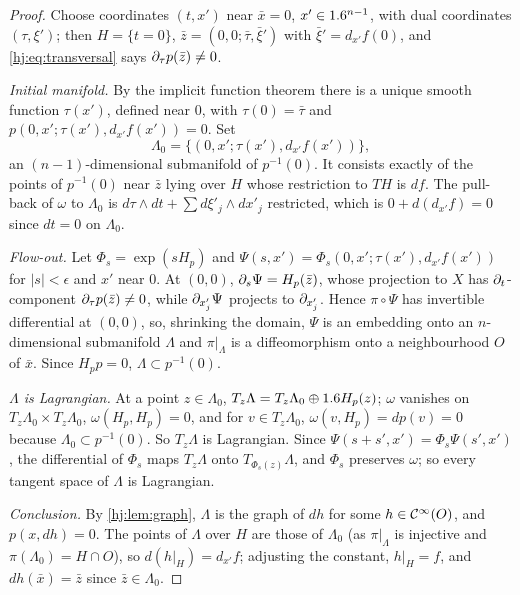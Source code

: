 \begin{proof}
  Choose coordinates $(t,x')$ near $\bar x=0$, $x'\in1.6^{n-1}$, with dual
  coordinates $(\tau,\xi')$; then $H=\{t=0\}$, $\bar z=(0,0;\bar\tau,\bar\xi')$
  with $\bar\xi'=d_{x'}f(0)$, and \eqref{hj:eq:transversal} says
  $\partial_\tau p(\bar z)\neq0$.

  \emph{Initial manifold.}  By the implicit function theorem there is a unique
  smooth function $\tau(x')$, defined near $0$, with $\tau(0)=\bar\tau$ and
  $p(0,x';\tau(x'),d_{x'}f(x'))=0$.  Set
  \begin{equation}\label{hj:eq:Lambda0}
    \Lambda_0=\{(0,x';\tau(x'),d_{x'}f(x'))\},
  \end{equation}
  an $(n-1)$-dimensional submanifold of $p^{-1}(0)$.  It consists exactly of the
  points of $p^{-1}(0)$ near $\bar z$ lying over $H$ whose restriction to $TH$ is
  $df$.  The pull-back of $\omega$ to $\Lambda_0$ is $d\tau\wedge dt+\sum
  d\xi'_j\wedge dx'_j$ restricted, which is $0+d(d_{x'}f)=0$ since $dt=0$ on
  $\Lambda_0$.

  \emph{Flow-out.}  Let $\Phi_s=\exp(sH_p)$ and $\Psi(s,x')=\Phi_s(0,x';\tau(x'),
  d_{x'}f(x'))$ for $|s|<\epsilon$ and $x'$ near $0$.  At $(0,0)$, $\partial_s\Psi=
  H_p(\bar z)$, whose projection to $X$ has $\partial_t$-component $\partial_\tau
  p(\bar z)\neq0$, while $\partial_{x'_j}\Psi$ projects to $\partial_{x'_j}$.  Hence
  $\pi\circ\Psi$ has invertible differential at $(0,0)$, so, shrinking the
  domain, $\Psi$ is an embedding onto an $n$-dimensional submanifold $\Lambda$
  and $\pi|_\Lambda$ is a diffeomorphism onto a neighbourhood $O$ of $\bar x$.
  Since $H_pp=0$, $\Lambda\subset p^{-1}(0)$.

  \emph{$\Lambda$ is Lagrangian.}  At a point $z\in\Lambda_0$,
  $T_z\Lambda=T_z\Lambda_0\oplus1.6 H_p(z)$; $\omega$ vanishes on
  $T_z\Lambda_0\times T_z\Lambda_0$, $\omega(H_p,H_p)=0$, and for $v\in
  T_z\Lambda_0$, $\omega(v,H_p)=dp(v)=0$ because $\Lambda_0\subset p^{-1}(0)$.
  So $T_z\Lambda$ is Lagrangian.  Since $\Psi(s+s',x')=\Phi_s\Psi(s',x')$, the
  differential of $\Phi_s$ maps $T_z\Lambda$ onto $T_{\Phi_s(z)}\Lambda$, and
  $\Phi_s$ preserves $\omega$; so every tangent space of $\Lambda$ is Lagrangian.

  \emph{Conclusion.}  By \cref{hj:lem:graph}, $\Lambda$ is the graph of $dh$ for
  some $h\in\mathcal{C}^\infty(O)$, and $p(x,dh)=0$.  The points of $\Lambda$ over $H$ are those
  of $\Lambda_0$ (as $\pi|_\Lambda$ is injective and $\pi(\Lambda_0)=H\cap O$), so
  $d(h|_H)=d_{x'}f$; adjusting the constant, $h|_H=f$, and $dh(\bar x)=\bar z$
  since $\bar z\in\Lambda_0$.


\end{proof}
